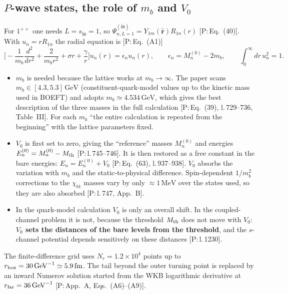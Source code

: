 \documentclass[11pt,a4paper]{article}
\newcommand{\tagP}[1]{\textcolor{blue!65!black}{\textsf{\small[P:\,#1]}}}
\newcommand{\Mth}{M_{\rm th}}
\newcommand{\GeV}{\,\mathrm{GeV}}
\newcommand{\MeV}{\,\mathrm{MeV}}
\newcommand{\fm}{\,\mathrm{fm}}
\begin{document}
\subsection{$P$-wave states, the role of $m_b$ and $V_0$}

For $1^{++}$ one needs $L=s_{\bar bb}=1$, so $\Psi^{(\bar bb)}_{n,L=1}=Y_{1m}(\hat{\bm r})R_{1n}(r)$ \tagP{Eq.~(40)}. With $u_n=rR_{1n}$ the radial equation is \tagP{Eq.~(A1)}
\begin{equation}
\Big[-\frac{1}{m_b}\frac{d^2}{dr^2}+\frac{2}{m_br^2}+\sigma r+\frac{\gamma}{r}\Big]u_n(r)=\epsilon_n u_n(r),\qquad \epsilon_n=M_n^{(0)}-2m_b,\qquad \int_0^\infty dr\,u_n^2=1 .
\end{equation}
\begin{itemize}
\item \textbf{$m_b$} is needed because the lattice works at $m_b\to\infty$. The paper scans $m_b\in[4.3,5.3]\GeV$ (constituent-quark-model values up to the kinetic mass used in BOEFT) and adopts $m_b\simeq4.534\GeV$, which gives the best description of the three masses in the full calculation \tagP{Eq.~(39), l.\,729--736, Table~III}. For each $m_b$ ``the entire calculation is repeated from the beginning'' with the lattice parameters fixed.
\item \textbf{$V_0$} is first set to zero, giving the ``reference'' masses $M_n^{(0)}$ and energies $E_n^{(0)}=M_n^{(0)}-\Mth$ \tagP{l.\,745--746}. It is then restored as a free constant in the bare energies: $E_n=E_n^{(0)}+V_0$ \tagP{Eq.~(63), l.\,937--938}. $V_0$ absorbs the variation with $m_b$ and the static-to-physical difference. Spin-dependent $1/m_b^2$ corrections to the $\chi_{b1}$ masses vary by only $\approx1\MeV$ over the states used, so they are also absorbed \tagP{l.\,747, App.~B}.
\item In the quark-model calculation $V_0$ is only an overall shift. In the coupled-channel problem it is not, because the threshold $\Mth$ does not move with $V_0$: \textbf{$V_0$ sets the distances of the bare levels from the threshold}, and the $s$-channel potential depends sensitively on these distances \tagP{l.\,1230}.
\end{itemize}

The finite-difference grid uses $N_r=1.2\times10^4$ points up to $r_{\rm box}=30\GeV^{-1}\simeq5.9\fm$. The tail beyond the outer turning point is replaced by an inward Numerov solution started from the WKB logarithmic derivative at $r_{\rm far}=36\GeV^{-1}$ \tagP{App.~A, Eqs.~(A6)--(A9)}.
\end{document}
